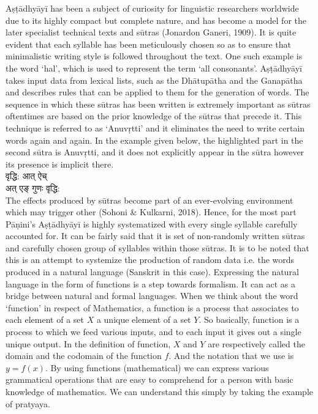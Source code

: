 Aṣṭādhyāyī has been a subject of curiosity for linguistic researchers worldwide due to its highly compact but complete nature, and has become a model for the later specialist technical texts and sūtras (Jonardon Ganeri, 1909). It is quite evident that each syllable has been meticulously chosen so as to ensure that minimalistic writing style is followed throughout the text. One such example is the word ‘hal’, which is used to represent the term ‘all consonants’. 
Aṣṭādhyāyī takes input data from lexical lists, such as the Dhātupātha and the Ganapātha and describes rules that can be applied to them for the generation of words. The sequence in which these sūtras has been written is extremely important as sūtras oftentimes are based on the prior knowledge of the sūtras that precede it. This technique is referred to as ‘Anuvṛtti’ and it eliminates the need to write certain words again and again. In the example given below, the highlighted part in the second sūtra is Anuvṛtti, and it does not explicitly appear in the sūtra however its presence is implicit there.\\
\texthindi{वृद्धि: आत् ऐच्\\
	अत् एङ् गुणः वृद्धि:}
\\The effects produced by sūtras become part of an ever-evolving environment which may trigger other (Sohoni \& Kulkarni, 2018). Hence, for the most part Pāṇini’s Aṣṭādhyāyī is highly systematized with every single syllable carefully accounted for. It can be fairly said that it is set of non-randomly written sūtras and carefully chosen group of syllables within those sūtras. It is to be noted that this is an attempt to systemize the production of random data i.e. the words produced in a natural language (Sanskrit in this case). 
Expressing the natural language in the form of functions is a step towards formalism. It can act as a bridge between natural and formal languages. When we think about the word ‘function’ in respect of Mathematics, a function is a process that associates to each element of a set $X$ a unique element of a set $Y$. So basically, function is a process to which we feed various inputs, and to each input it gives out a single unique output. In the definition of function, $X$ and $Y$ are respectively called the domain and the codomain of the function $f$. And the notation that we use is $y = f (x)$. By using functions (mathematical) we can express various grammatical operations that are easy to comprehend for a person with basic knowledge of mathematics. We can understand this simply by taking the example of pratyaya. 
